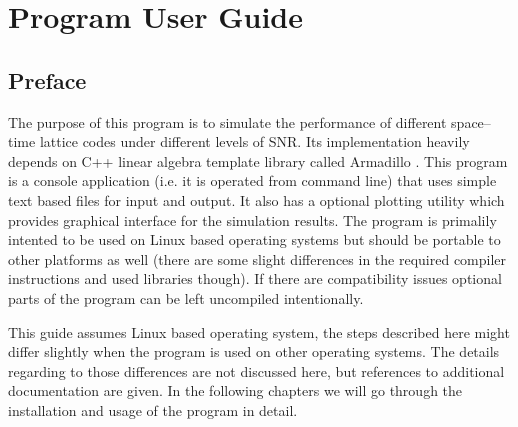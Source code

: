 \documentclass[english,12pt,a4paper,pdftex,sci,utf8]{aaltothesis}
\begin{document}
\clearpage

\thesisappendix

\section{Program User Guide}


\subsection{Preface}
The purpose of this program is to simulate the performance of different space--time lattice codes under different levels of SNR. Its implementation heavily depends on C++ linear algebra template library called Armadillo \cite{arma}. This program is a console application (i.e. it is operated from command line) that uses simple text based files for input and output. It also has a optional plotting utility which provides graphical interface for the simulation results. The program is primalily intented to be used on Linux based operating systems but should be portable to other platforms as well (there are some slight differences in the required compiler instructions and used libraries though). If there are compatibility issues optional parts of the program can be left uncompiled intentionally. 
\par This guide assumes Linux based operating system, the steps described here might differ slightly when the program is used on other operating systems. The details regarding to those differences are not discussed here, but references to additional documentation are given. In the following chapters we will go through the installation and usage of the program in detail. 
\end{document}
